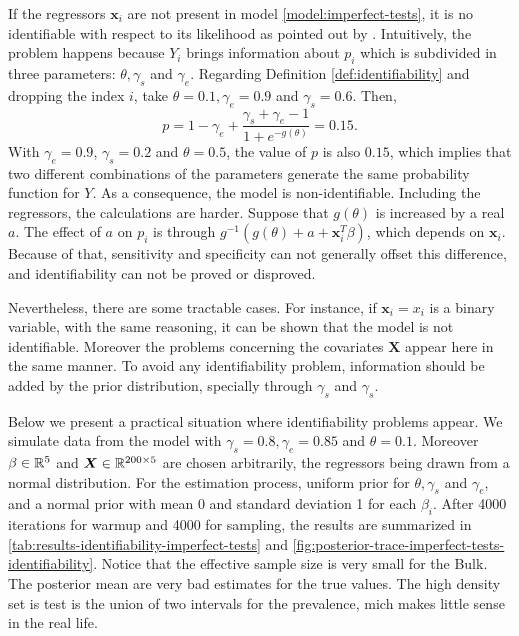 If the regressors $\boldsymbol{x}_i$ are not present in model
\eqref{model:imperfect-tests}, it is no identifiable with respect to its
likelihood as pointed out by \textcite[p. 1271]{gelman2020bayesian}. 
Intuitively, the problem happens because $Y_i$ brings information about 
$p_i$ which is subdivided in three parameters: $\theta, \gamma_s$ and
$\gamma_e$. Regarding Definition \ref{def:identifiability} and dropping the
index $i$, take $\theta = 0.1, \gamma_e = 0.9$ and $\gamma_s = 0.6$. Then, 
\begin{equation*}
    p = 1 - \gamma_e + \frac{\gamma_s + \gamma_e - 1}{1 + e^{-g(\theta)}} = 0.15.
\end{equation*}
With $\gamma_e = 0.9$, $\gamma_s = 0.2$ and $\theta = 0.5$, the value of $p$
is also $0.15$, which implies that two
different combinations of the parameters generate the same probability
function for $Y$. As a consequence, the model is non-identifiable. Including the
regressors, the calculations are harder. Suppose that $g(\theta)$
is increased by a real $a$. The effect of $a$ on $p_i$ is through
$g^{-1}(g(\theta) + a + \boldsymbol{x}_i^T\beta)$, which depends on
$\boldsymbol{x}_i$. Because of that, sensitivity and specificity can not generally
offset this difference, and identifiability can not be proved or disproved. 

Nevertheless, there are some tractable cases. For instance, if $\boldsymbol{x}_i = x_i$ is a binary variable, with the same
reasoning, it can be shown that the model is not identifiable. Moreover the
problems concerning the covariates $\boldsymbol{X}$ appear here in the same
manner. To avoid any identifiability problem, information should be added by
the prior distribution, specially through $\gamma_s$ and $\gamma_s$. 

Below we present a practical situation where identifiability problems appear. 
We simulate data from the model with $\gamma_s = 0.8, \gamma_e = 0.85$ and
$\theta = 0.1$. Moreover $\beta \in \mathbb{R}^5$ and $\boldsymbol{X} \in \mathbb{R}^{200
\times 5}$ are chosen arbitrarily, the regressors being drawn from a normal
distribution. For the estimation process, uniform prior for $\theta, \gamma_s$
and $\gamma_e$, and a normal prior with mean 0 and standard deviation 1 for
each $\beta_i$. After 4000 iterations for warmup and 4000 for sampling, the
results are summarized in 
\autoref{tab:results-identifiability-imperfect-tests}
and \autoref{fig:posterior-trace-imperfect-tests-identifiability}. Notice that
the effective sample size is very small for the Bulk. The posterior mean are
very bad estimates for the true values. The high density set is test is the
union of two intervals for the prevalence, mich makes little sense in the real
life. 

